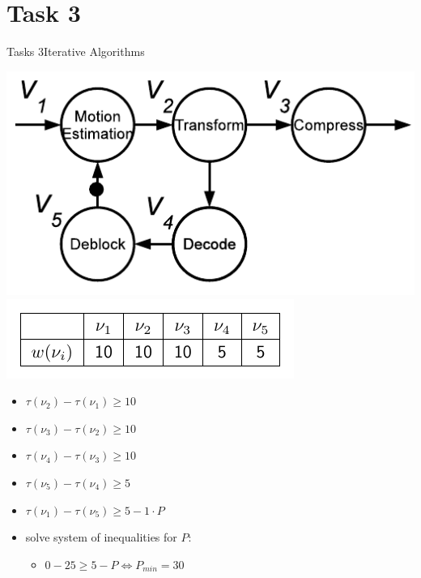 
\section{Task 3}

\setcounter{task}{1}

\begin{frame}[allowframebreaks]{Tasks 3}{Iterative Algorithms}
  \begin{tasknoinc}
    \includegraphics[width=.5\textwidth]{./figures/task3_marked_graph_representation.png}
    \includegraphics[width=.4\textwidth]{./figures/task3_execution_time_of_each_function.png}
  \end{tasknoinc}
  \begin{solution}
    \begin{itemize}
      \item $\tau\left(\nu_2\right)-\tau\left(\nu_1\right) \geq 10$
      \item $\tau\left(\nu_3\right)-\tau\left(\nu_2\right) \geq 10$
      \item $\tau\left(\nu_4\right)-\tau\left(\nu_3\right) \geq 10$
      \item $\tau\left(\nu_5\right)-\tau\left(\nu_4\right) \geq 5$
      \item $\tau\left(\nu_1\right)-\tau\left(\nu_5\right) \geq 5-1 \cdot P$
    \end{itemize}
  \end{solution}
  \framebreak
  \begin{solutionnoinc}
    \begin{itemize}
      \item solve system of inequalities for $P$:
        \begin{itemize}
          \item $0 - 25 \geq 5 - P  \Leftrightarrow P_{min} = 30$

\end{itemize}
\end{itemize}
\end{solutionnoinc}
\end{frame}

